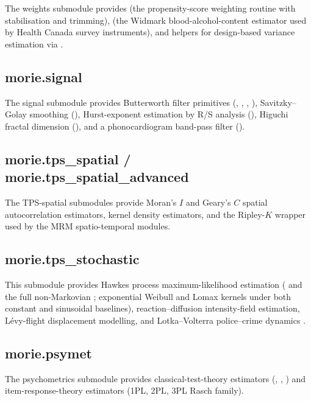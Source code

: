 \documentclass[article,shortnames,nojss]{jss}
\begin{document}
The weights submodule provides
 (the propensity-score
weighting routine with stabilisation and trimming),
 (the Widmark
blood-alcohol-content estimator used by Health Canada survey
instruments), and helpers for design-based variance estimation
via .

\subsection{morie.signal}

The signal submodule provides Butterworth filter primitives
(, , , ),
Savitzky--Golay smoothing (), Hurst-exponent
estimation by R/S analysis (), Higuchi fractal
dimension (), and a phonocardiogram band-pass filter
().

\subsection[morie.tps spatial]{morie.tps\_spatial / morie.tps\_spatial\_advanced}

The TPS-spatial submodules provide Moran's $I$ and Geary's $C$
spatial autocorrelation estimators, kernel density estimators,
and the Ripley-$K$ wrapper used by the MRM spatio-temporal
modules.

\subsection[morie.tps stochastic]{morie.tps\_stochastic}

This submodule provides Hawkes process maximum-likelihood
estimation ( and the full non-Markovian ; exponential
Weibull and Lomax kernels under both constant and sinusoidal baselines), reaction--diffusion intensity-field
estimation, L\'evy-flight displacement modelling, and
Lotka--Volterra police--crime dynamics
\citep{Mohler2011, Ruhela2026Hawkes}.

\subsection{morie.psymet}

The psychometrics submodule  provides classical-test-theory
estimators (, ,
) and item-response-theory estimators
(1PL, 2PL, 3PL Rasch family).
\end{document}
